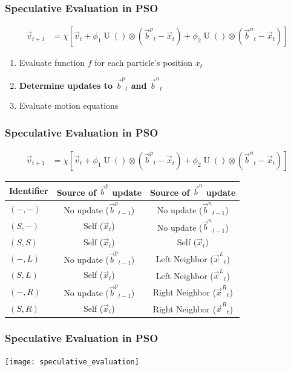 \documentclass{beamer}
\DeclareMathOperator{\URand}{U}
\providecommand{\ppos}{\ensuremath{\Vec{x}}}
\providecommand{\pvel}{\ensuremath{\Vec{v}}}
\providecommand{\nbest}{\ensuremath{\Vec{b}^n}}
\providecommand{\pbest}{\ensuremath{\Vec{b}^p}}
\providecommand{\constriction}{\ensuremath{\chi}}
\providecommand{\coeff}{\ensuremath{\phi}}
\providecommand{\leftn}{\ensuremath{\Vec{x}^\leftind}}
\providecommand{\rightn}{\ensuremath{\Vec{x}^\rightind}}
\providecommand{\leftind}{\ensuremath{L}}
\providecommand{\rightind}{\ensuremath{R}}
\providecommand{\casexn}{\ensuremath{(S,-)}}
\providecommand{\casexx}{\ensuremath{(S,S)}}
\providecommand{\casexl}{\ensuremath{(S,\leftind)}}
\providecommand{\casexr}{\ensuremath{(S,\rightind)}}
\providecommand{\casepn}{\ensuremath{(-,-)}}
\providecommand{\casepl}{\ensuremath{(-,\leftind)}}
\providecommand{\casepr}{\ensuremath{(-,\rightind)}}
\begin{document}
\begin{frame}
  \frametitle{Speculative Evaluation in PSO}
  \begin{align*}
	  \pvel_{t+1} &=
		  \constriction \left[ \pvel_t +
			  \coeff_1\URand()\otimes(\pbest_t - \ppos_t) +
			  \coeff_2\URand()\otimes(\nbest_t - \ppos_t)
		  \right]
  \end{align*}
  \begin{enumerate}
	\item Evaluate function $f$ for each particle's position $x_t$
	\item \textbf{Determine updates to $\pbest_t$ and $\nbest_t$}
	\item Evaluate motion equations
  \end{enumerate}
\end{frame}

\begin{frame}
  \frametitle{Speculative Evaluation in PSO}
  \begin{align*}
	  \pvel_{t+1} &=
		  \constriction \left[ \pvel_t +
			  \coeff_1\URand()\otimes(\pbest_t - \ppos_t) +
			  \coeff_2\URand()\otimes(\nbest_t - \ppos_t)
		  \right]
  \end{align*}
  \begin{center}
	\begin{tabular}{lcc}
	  Identifier&Source of $\pbest$ update&Source of $\nbest$ update\\
	  \hline
	  \hline
	  $\casepn$&No update ($\pbest_{t-1}$)&No update ($\nbest_{t-1}$)\\
	  \hline
	  $\casexn$&Self ($\ppos_t$)&No update ($\nbest_{t-1}$)\\
	  \hline
	  $\casexx$&Self ($\ppos_t$)&Self ($\ppos_t$)\\
	  \hline
	  $\casepl$&No update ($\pbest_{t-1}$)&Left Neighbor ($\leftn_t$)\\
	  \hline
	  $\casexl$&Self ($\ppos_t$)&Left Neighbor ($\leftn_t$)\\
	  \hline
	  $\casepr$&No update ($\pbest_{t-1}$)&Right Neighbor ($\rightn_t$)\\
	  \hline
	  $\casexr$&Self ($\ppos_t$)&Right Neighbor ($\rightn_t$)\\
	  \hline
	\end{tabular}
  \end{center}
\end{frame}

\begin{frame}
  \frametitle{Speculative Evaluation in PSO}
  \texttt{[image: speculative\_evaluation]}
\end{frame}
\end{document}
